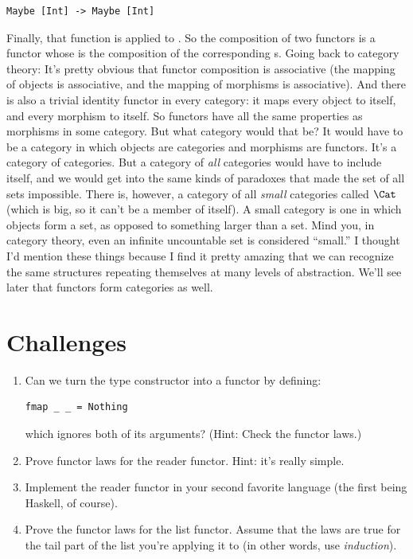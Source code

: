 \begin{Verbatim}
Maybe [Int] -> Maybe [Int]
\end{Verbatim}
Finally, that function is applied to . So the composition of
two functors is a functor whose  is the composition of the
corresponding s. Going back to category theory: It's pretty
obvious that functor composition is associative (the mapping of objects
is associative, and the mapping of morphisms is associative). And there
is also a trivial identity functor in every category: it maps every
object to itself, and every morphism to itself. So functors have all the
same properties as morphisms in some category. But what category would
that be? It would have to be a category in which objects are categories
and morphisms are functors. It's a category of categories. But a
category of \emph{all} categories would have to include itself, and we
would get into the same kinds of paradoxes that made the set of all sets
impossible. There is, however, a category of all \emph{small} categories
called $\Cat$ (which is big, so it can't be a member of itself). A
small category is one in which objects form a set, as opposed to
something larger than a set. Mind you, in category theory, even an
infinite uncountable set is considered ``small.'' I thought I'd mention
these things because I find it pretty amazing that we can recognize the
same structures repeating themselves at many levels of abstraction.
We'll see later that functors form categories as well.

\section{Challenges}

\begin{enumerate}
\tightlist
\item
  Can we turn the  type constructor into a functor by
  defining:

\begin{Verbatim}
fmap _ _ = Nothing
\end{Verbatim}

  which ignores both of its arguments? (Hint: Check the functor laws.)
\item
  Prove functor laws for the reader functor. Hint: it's really simple.
\item
  Implement the reader functor in your second favorite language (the
  first being Haskell, of course).
\item
  Prove the functor laws for the list functor. Assume that the laws are
  true for the tail part of the list you're applying it to (in other
  words, use \emph{induction}).
\end{enumerate}
